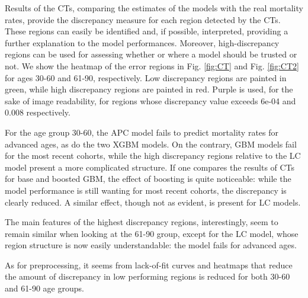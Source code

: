 \documentclass[fleqn,10pt]{wlscirep}
\begin{document}
%
Results of the CTs, comparing the estimates of the models with the real mortality rates, provide the discrepancy measure for each region detected by the CTs. %
These regions can easily be identified and, if possible, interpreted, providing a further explanation to the model performances. Moreover, high-discrepancy regions can be used for assessing whether or where a model should be trusted or not. We show the heatmap of the error regions in Fig. \ref{fig:CT} and Fig. \ref{fig:CT2} for ages 30-60 and 61-90, respectively. Low discrepancy regions are painted in green, while high discrepancy regions are painted in red. Purple is used, for the sake of image readability, for regions whose discrepancy value exceeds 6e-04 and 0.008 respectively.

For the age group 30-60, the APC model fails to predict mortality rates for advanced ages, as do the two XGBM models. On the contrary, GBM models fail for the most recent cohorts, while the high discrepancy regions relative to the LC model present a more complicated structure. 
If one compares the results of CTs for base and boosted GBM, the effect of boosting is quite noticeable: while the model performance is still wanting for most recent cohorts, the discrepancy is clearly reduced. A similar effect, though not as evident, is present for LC models.

The main features of the highest discrepancy regions, interestingly, seem to remain similar when looking at the 61-90 group, except for the LC model, whose region structure is now easily understandable: the model fails for advanced ages.

As for preprocessing, it seems from lack-of-fit curves and heatmaps that reduce the amount of discrepancy in low performing regions is reduced for both 30-60 and 61-90 age groups.
\end{document}
